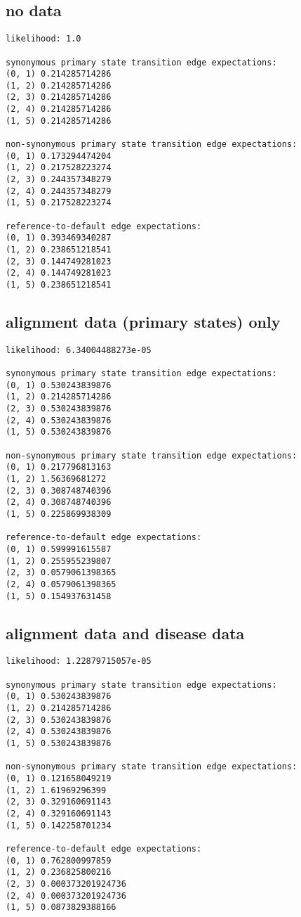 \documentclass{article}
\begin{document}
\subsection{no data}
\begin{verbatim}
likelihood: 1.0

synonymous primary state transition edge expectations:
(0, 1) 0.214285714286
(1, 2) 0.214285714286
(2, 3) 0.214285714286
(2, 4) 0.214285714286
(1, 5) 0.214285714286

non-synonymous primary state transition edge expectations:
(0, 1) 0.173294474204
(1, 2) 0.217528223274
(2, 3) 0.244357348279
(2, 4) 0.244357348279
(1, 5) 0.217528223274

reference-to-default edge expectations:
(0, 1) 0.393469340287
(1, 2) 0.238651218541
(2, 3) 0.144749281023
(2, 4) 0.144749281023
(1, 5) 0.238651218541
\end{verbatim}

\subsection{alignment data (primary states) only}
\begin{verbatim}
likelihood: 6.34004488273e-05

synonymous primary state transition edge expectations:
(0, 1) 0.530243839876
(1, 2) 0.214285714286
(2, 3) 0.530243839876
(2, 4) 0.530243839876
(1, 5) 0.530243839876

non-synonymous primary state transition edge expectations:
(0, 1) 0.217796813163
(1, 2) 1.56369681272
(2, 3) 0.308748740396
(2, 4) 0.308748740396
(1, 5) 0.225869938309

reference-to-default edge expectations:
(0, 1) 0.599991615587
(1, 2) 0.255955239807
(2, 3) 0.0579061398365
(2, 4) 0.0579061398365
(1, 5) 0.154937631458
\end{verbatim}

\subsection{alignment data and disease data}
\begin{verbatim}
likelihood: 1.22879715057e-05

synonymous primary state transition edge expectations:
(0, 1) 0.530243839876
(1, 2) 0.214285714286
(2, 3) 0.530243839876
(2, 4) 0.530243839876
(1, 5) 0.530243839876

non-synonymous primary state transition edge expectations:
(0, 1) 0.121658049219
(1, 2) 1.61969296399
(2, 3) 0.329160691143
(2, 4) 0.329160691143
(1, 5) 0.142258701234

reference-to-default edge expectations:
(0, 1) 0.762800997859
(1, 2) 0.236825800216
(2, 3) 0.000373201924736
(2, 4) 0.000373201924736
(1, 5) 0.0873829388166
\end{verbatim}
\end{document}
